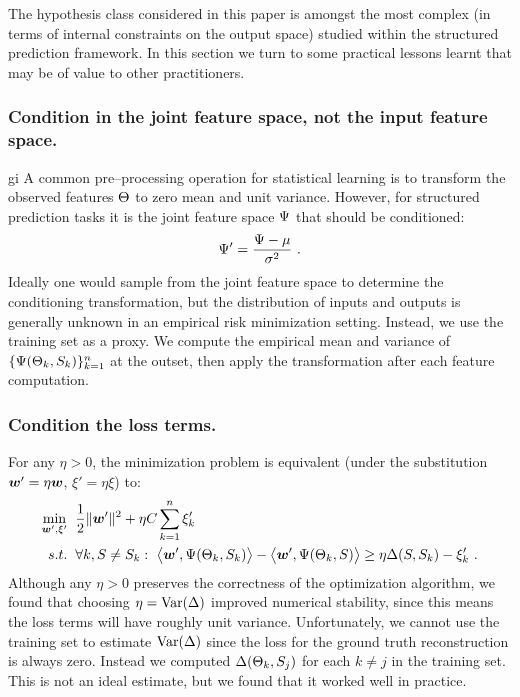 The hypothesis class considered in this paper is amongst the most
complex (in terms of internal constraints on the output space) studied
within the structured prediction framework. In this section we turn to
some practical lessons learnt that may be of value to other
practitioners.

\subsubsection{Condition in the joint feature space, not the input
  feature space.}
gi
A common pre--processing operation for statistical learning is to
transform the observed features $\Theta$ to zero mean and unit
variance. However, for structured prediction tasks it is the joint
feature space $\Psi$ that should be conditioned:
\begin{equation}
  \label{eq:conditioning}
  \Psi' = \frac{\Psi - \mu}{\sigma^2} ~.
\end{equation}
Ideally one would sample from the joint feature space to determine the
conditioning transformation, but the distribution of inputs and
outputs is generally unknown in an empirical risk minimization
setting. Instead, we use the training set as a proxy. We compute the
empirical mean and variance of
$\{\Psi(\Theta_k,S_k)\}_{k=1}^n$ at the outset, then apply
the transformation  after each feature
computation.

\subsubsection{Condition the loss terms.}

For any $\eta>0$, the minimization problem  is
equivalent (under the substitution $\boldsymbol{w}'=\eta\boldsymbol{w}$,
$\xi'=\eta\xi$) to:
\begin{equation}
  \begin{split}
    \min_{\boldsymbol{w}',\xi'} &
      \hspace{2mm} 
    \frac{1}{2} \|\boldsymbol{w}'\|^2 +
      \eta C \sum_{k=1}^n \xi_k'\\
    s.t. & \hspace{2mm} \forall k, S \neq S_k:~
      \bigl\langle\boldsymbol{w}', \Psi(\Theta_k,S_k)\bigr\rangle -
      \bigl\langle\boldsymbol{w}', \Psi(\Theta_k,S)\bigr\rangle
      \geq
      \eta \Delta(S,S_k) - \xi_k' ~.
  \end{split}
  \label{eq:equiv-problem}
\end{equation}
Although any $\eta>0$ preserves the correctness of the optimization
algorithm, we found that choosing $\eta=\mbox{Var}(\Delta)$ improved
numerical stability, since this means the loss terms will have roughly
unit variance. Unfortunately, we cannot use the training set to
estimate $\mbox{Var}(\Delta)$ since the loss for the ground truth
reconstruction is always zero. Instead we computed
$\Delta(\Theta_k,S_j)$ for each $k \neq j$ in the training
set. This is not an ideal estimate, but we found that it worked well
in practice.

